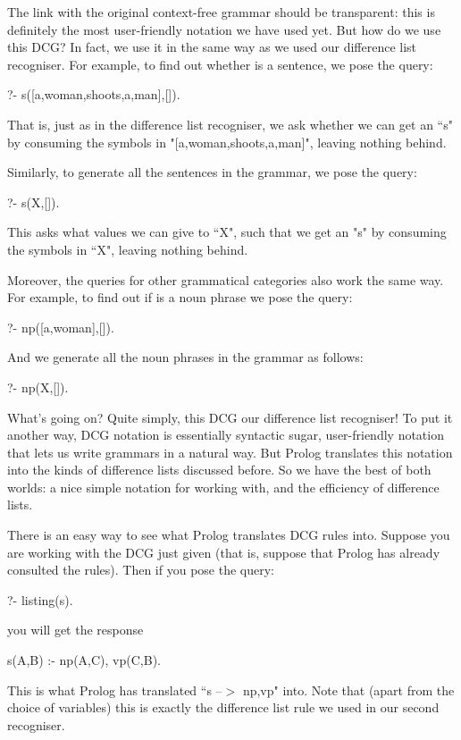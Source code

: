 The link with the original context-free grammar should be transparent:
this is definitely the most user-friendly notation we have used yet.
But how do we use this DCG? In fact, we use it in 
the same way as we used our difference list recogniser.  For example,
to find out whether  is a sentence, we
pose the query:

\begin{LPNcodedisplay}
?- s([a,woman,shoots,a,man],[]).
\end{LPNcodedisplay}
That is, just as in the difference list recogniser, we ask
whether we can get an ``s" by consuming the symbols in
"[a,woman,shoots,a,man]", leaving nothing behind.

Similarly, to generate all the sentences in the grammar,
we pose the query:
\begin{LPNcodedisplay}
?- s(X,[]).
\end{LPNcodedisplay}
This asks what values we can give to ``X", such that we get an
"s" by consuming the symbols in ``X", leaving nothing behind.

Moreover, the queries for other grammatical categories also work the
same way.  For example, to find out if  is a noun phrase
we pose the query:
\begin{LPNcodedisplay}
?- np([a,woman],[]).
\end{LPNcodedisplay}
And we generate all the noun phrases in the grammar as follows:
\begin{LPNcodedisplay}
?- np(X,[]).
\end{LPNcodedisplay}


What's going on?  Quite simply, this DCG  our difference
list recogniser!  To put it another way, DCG notation is essentially
syntactic sugar, user-friendly notation that lets us write grammars in
a natural way.  But Prolog translates this notation into the kinds of
difference lists discussed before.  So we have the best of both
worlds: a nice simple notation for working with, and the
efficiency of difference lists.

There is an easy way to see what Prolog translates DCG rules into.
Suppose you are working with the DCG just given (that is, suppose that
Prolog has already consulted the rules).  Then if you pose the query:
\begin{LPNcodedisplay}
?- listing(s).
\end{LPNcodedisplay}
you will get the response
\begin{LPNcodedisplay}
s(A,B) :-
    np(A,C),
    vp(C,B).
\end{LPNcodedisplay}
This is what Prolog has translated ``s --$>$ np,vp" into. Note
that (apart from the choice of variables) this is exactly the
difference list rule we used in our second recogniser.

